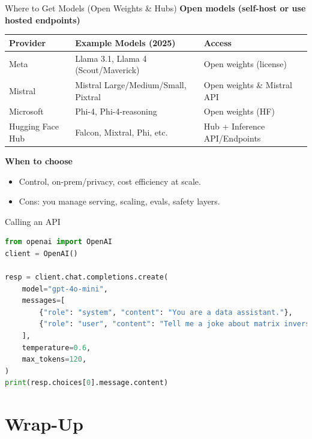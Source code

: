 \documentclass[aspectratio=169]{beamer}
\begin{document}
\begin{frame}{Where to Get Models (Open Weights \& Hubs)}
  \vspace{-0.3em}
  \textbf{Open models (self-host or use hosted endpoints)}
  \begin{center}
    \begin{tabular}{@{}lll@{}}
      \toprule
      Provider & Example Models (2025) & Access \\
      \midrule
      Meta & Llama 3.1, Llama 4 (Scout/Maverick) & Open weights (license) \\
      Mistral & Mistral Large/Medium/Small, Pixtral & Open weights \& Mistral API \\
      Microsoft & Phi-4, Phi-4-reasoning & Open weights (HF) \\
      Hugging Face Hub & Falcon, Mixtral, Phi, etc. & Hub + Inference API/Endpoints \\
      \bottomrule
    \end{tabular}
  \end{center}

  \vspace{0.6em}
  \textbf{When to choose}
  \begin{itemize}
    \item Control, on-prem/privacy, cost efficiency at scale.
    \item Cons: you manage serving, scaling, evals, safety layers.
  \end{itemize}
\end{frame}

\begin{frame}[fragile]{Calling an API}
  \begin{lstlisting}[language=Python]
from openai import OpenAI
client = OpenAI()

resp = client.chat.completions.create(
    model="gpt-4o-mini",
    messages=[
        {"role": "system", "content": "You are a data assistant."},
        {"role": "user", "content": "Tell me a joke about matrix inversion."}
    ],
    temperature=0.6,
    max_tokens=120,
)
print(resp.choices[0].message.content)
  \end{lstlisting}
\end{frame}


\section{Wrap-Up}
\end{document}
